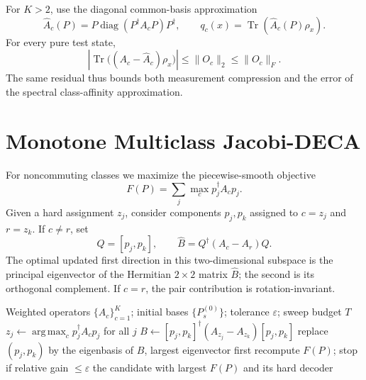 \documentclass[10pt,twocolumn]{article}
\theoremstyle{definition}
\theoremstyle{remark}
\newcommand{\Tr}{\operatorname{Tr}}
\newcommand{\diag}{\operatorname{diag}}
\newcommand{\argmax}{\operatorname*{arg\,max}}
\begin{document}
For $K>2$, use the diagonal common-basis approximation
\begin{equation}
\widehat A_c(P)
=P\diag(P^\dagger A_cP)P^\dagger,\qquad
q_c(x)=\Tr(\widehat A_c(P)\rho_x).
\label{eq:multiclass_spectral}
\end{equation}
For every pure test state,
\begin{equation}
\left|\Tr\big((A_c-\widehat A_c)\rho_x\big)\right|
\le\|O_c\|_2\le\|O_c\|_F.
\end{equation}
The same residual thus bounds both measurement compression and the error of
the spectral class-affinity approximation.

\section{Monotone Multiclass Jacobi-DECA}
\label{sec:algorithm}

For noncommuting classes we maximize the piecewise-smooth objective
\begin{equation}
F(P)=\sum_j\max_c p_j^\dagger A_cp_j.
\end{equation}
Given a hard assignment $z_j$, consider components $p_j,p_k$ assigned to
$c=z_j$ and $r=z_k$.  If $c\ne r$, set
\begin{equation}
Q=[p_j,p_k],\qquad
\widehat B=Q^\dagger(A_c-A_r)Q.
\end{equation}
The optimal updated first direction in this two-dimensional subspace is the
principal eigenvector of the Hermitian $2\times2$ matrix $\widehat B$; the
second is its orthogonal complement.  If $c=r$, the pair contribution is
rotation-invariant.

\begin{algorithm}[t]
\caption{Jacobi-DECA}
\label{alg:jacobi}
\begin{algorithmic}[1]
\Require Weighted operators $\{A_c\}_{c=1}^K$; initial bases
$\{P^{(0)}_s\}$; tolerance $\varepsilon$; sweep budget $T$
    \State $z_j\gets\argmax_c p_j^\dagger A_cp_j$ for all $j$
      \State $B\gets [p_j,p_k]^\dagger(A_{z_j}-A_{z_k})[p_j,p_k]$
      \State replace $(p_j,p_k)$ by the eigenbasis of $B$,
      largest eigenvector first
    \EndFor
    \State recompute $F(P)$; stop if relative gain $\le\varepsilon$
  \EndFor
\EndFor
\State \Return the candidate with largest $F(P)$ and its hard decoder
\end{algorithmic}
\end{algorithm}
\end{document}
